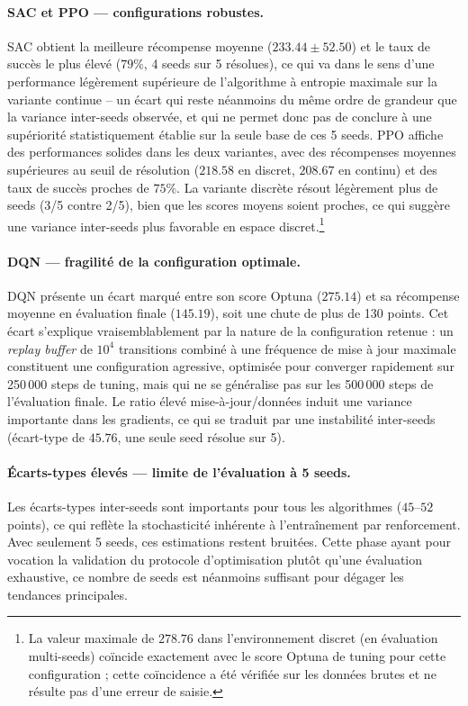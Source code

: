 \paragraph{SAC et PPO --- configurations robustes.}
SAC obtient la meilleure récompense moyenne ($233.44 \pm 52.50$) et le taux de succès le plus élevé ($79\%$, 4 seeds sur 5 résolues), ce qui va dans le sens d'une performance légèrement supérieure de l'algorithme à entropie maximale sur la variante continue -- un écart qui reste néanmoins du même ordre de grandeur que la variance inter-seeds observée, et qui ne permet donc pas de conclure à une supériorité statistiquement établie sur la seule base de ces 5 seeds.
PPO affiche des performances solides dans les deux variantes, avec des
récompenses moyennes supérieures au seuil de résolution ($218.58$ en discret,
$208.67$ en continu) et des taux de succès proches de $75\%$. La variante
discrète résout légèrement plus de seeds (3/5 contre 2/5), bien que les scores
moyens soient proches, ce qui suggère une variance inter-seeds plus favorable
en espace discret.\footnote{La valeur maximale de $278.76$ dans l'environnement discret (en évaluation multi-seeds) coïncide exactement avec le score Optuna de tuning pour cette configuration ; cette coïncidence a été vérifiée sur les données brutes et ne résulte pas d'une erreur de saisie.}

\paragraph{DQN --- fragilité de la configuration optimale.}
DQN présente un écart marqué entre son score Optuna ($275.14$) et sa
récompense moyenne en évaluation finale ($145.19$), soit une chute de plus de
130 points. Cet écart s'explique vraisemblablement par la nature de la
configuration retenue : un \textit{replay buffer} de $10^4$ transitions combiné à une fréquence de mise à jour maximale constituent une configuration agressive, optimisée
pour converger rapidement sur 250\,000 steps de tuning, mais qui ne se
généralise pas sur les 500\,000 steps de l'évaluation finale. Le ratio élevé
mise-à-jour/données induit une variance importante dans les gradients, ce qui
se traduit par une instabilité inter-seeds (écart-type de $45.76$, une seule
seed résolue sur 5).

\paragraph{Écarts-types élevés --- limite de l'évaluation à 5 seeds.}
\label{sec:limite-eval-5-seeds}
Les écarts-types inter-seeds sont importants pour tous les algorithmes
($45$--$52$ points), ce qui reflète la stochasticité inhérente à
l'entraînement par renforcement. Avec seulement 5 seeds, ces estimations
restent bruitées. Cette phase ayant pour vocation la validation du protocole
d'optimisation plutôt qu'une évaluation exhaustive, ce nombre de seeds est
néanmoins suffisant pour dégager les tendances principales.

